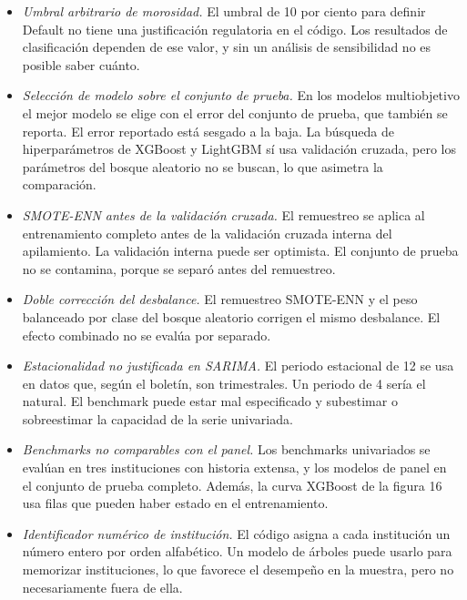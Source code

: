 \begin{itemize}
    \item \textit{Umbral arbitrario de morosidad.} El umbral de 10 por ciento para definir Default no tiene una justificación regulatoria en el código. Los resultados de clasificación dependen de ese valor, y sin un análisis de sensibilidad no es posible saber cuánto.

    \item \textit{Selección de modelo sobre el conjunto de prueba.} En los modelos multiobjetivo el mejor modelo se elige con el error del conjunto de prueba, que también se reporta. El error reportado está sesgado a la baja. La búsqueda de hiperparámetros de XGBoost y LightGBM sí usa validación cruzada, pero los parámetros del bosque aleatorio no se buscan, lo que asimetra la comparación.

    \item \textit{SMOTE-ENN antes de la validación cruzada.} El remuestreo se aplica al entrenamiento completo antes de la validación cruzada interna del apilamiento. La validación interna puede ser optimista. El conjunto de prueba no se contamina, porque se separó antes del remuestreo.

    \item \textit{Doble corrección del desbalance.} El remuestreo SMOTE-ENN y el peso balanceado por clase del bosque aleatorio corrigen el mismo desbalance. El efecto combinado no se evalúa por separado.

    \item \textit{Estacionalidad no justificada en SARIMA.} El periodo estacional de 12 se usa en datos que, según el boletín, son trimestrales. Un periodo de 4 sería el natural. El benchmark puede estar mal especificado y subestimar o sobreestimar la capacidad de la serie univariada. %

    \item \textit{Benchmarks no comparables con el panel.} Los benchmarks univariados se evalúan en tres instituciones con historia extensa, y los modelos de panel en el conjunto de prueba completo. Además, la curva XGBoost de la figura 16 usa filas que pueden haber estado en el entrenamiento.

    \item \textit{Identificador numérico de institución.} El código asigna a cada institución un número entero por orden alfabético. Un modelo de árboles puede usarlo para memorizar instituciones, lo que favorece el desempeño en la muestra, pero no necesariamente fuera de ella.


\end{itemize}
